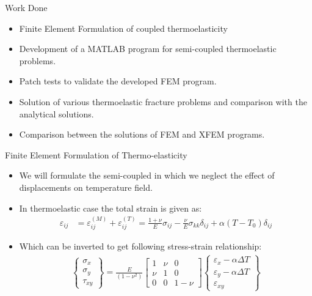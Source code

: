 \documentclass{beamer}
\begin{document}
\begin{frame}[t,fragile]{Work Done}
    \begin{itemize}
        \item Finite Element Formulation of coupled thermoelasticity 
        \item Development of a MATLAB program for semi-coupled thermoelastic problems.
        \item Patch tests to validate the developed FEM program.
        \item Solution of various thermoelastic fracture problems and comparison with the analytical solutions. 
        \item Comparison between the solutions of FEM and XFEM programs. 
    \end{itemize}
\end{frame}
\begin{frame}[t,fragile]{Finite Element Formulation of Thermo-elasticity}
\begin{itemize}
\item We will formulate the semi-coupled in which we neglect the effect of displacements on temperature field.
\item In thermoelastic case the total strain is given as: 
\begin{align*}
    \varepsilon_{ij}&=\varepsilon_{ij}^{(M)}+\varepsilon_{ij}^{(T)}
    =\frac{1+\nu}{E}\sigma_{ij}-\frac{\nu}{E}\sigma_{kk}\delta_{ij}+\alpha(T-T_0)\delta_{ij}\nonumber
\end{align*}
\item Which can be inverted to get following stress-strain relationship:
    \footnotesize
\begin{align*}
    \begin{Bmatrix}
        \sigma_{x}\\ \sigma_{y}\\ \tau_{xy} 
    \end{Bmatrix} =\frac{E}{(1-\nu^2)}
    \begin{bmatrix}
        1 & \nu & 0 \\ \nu & 1 & 0 \\ 0 & 0 & 1-\nu 
    \end{bmatrix}
    \begin{Bmatrix}
        \varepsilon_{x}-\alpha\Delta T \\ \varepsilon_{y}-\alpha \Delta T \\ \varepsilon_{xy} 
    \end{Bmatrix}
\end{align*}
\end{itemize}

\end{frame}
\end{document}
